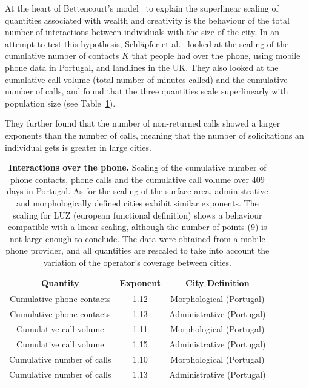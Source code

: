 At the heart of Bettencourt's model~\cite{Bettencourt:2013} to explain the
superlinear scaling of quantities associated with wealth and creativity is the
behaviour of the total number of interactions between individuals with the size
of the city. In an attempt to test this hypothesis, Schl\"apfer et
al.~\cite{Schlapfer:2014} looked at the scaling of the cumulative number of
contacts $K$ that people had over the phone, using mobile phone data in
Portugal, and landlines in the UK. They also looked at the cumulative call
volume (total number of minutes called) and the cumulative number of calls, and
found that the three quantities scale superlinearly with population size (see
Table~\ref{tab:interactions}). 

They further found that the number of non-returned calls showed a larger
exponents than the number of calls, meaning that the number of solicitations an
individual gets is greater in large cities.\\


\begin{table}[!h]
    \centering
\begin{tabular}{|ccc|}
\hline
Quantity & Exponent & City Definition\\
\hline
Cumulative phone contacts & 1.12 & Morphological (Portugal)\\
Cumulative phone contacts & 1.13 & Administrative (Portugal)\\
\hline
Cumulative call volume & 1.11 & Morphological (Portugal)\\
Cumulative call volume & 1.15 & Administrative (Portugal)\\
\hline
Cumulative number of calls & 1.10 & Morphological (Portugal)\\
Cumulative number of calls & 1.13 & Administrative (Portugal)\\
\hline
\end{tabular}
\caption{{\bf Interactions over the phone.} Scaling of the cumulative number of
    phone contacts, phone calls and the cumulative call volume over $409$ days
    in Portugal. As for the scaling of the surface area, administrative and
    morphologically defined cities exhibit similar exponents. The scaling for
    LUZ (european functional definition) shows a behaviour compatible with a
    linear scaling, although the number of points (9) is not large enough to
    conclude. The data were obtained from a mobile phone provider, and all
    quantities are rescaled to take into
    account the variation of the operator's coverage between
cities.\label{tab:interactions}}
\end{table}

